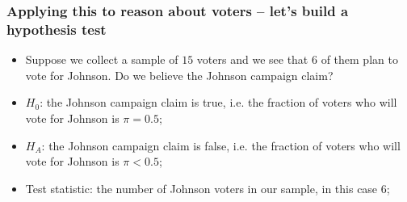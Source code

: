\documentclass[aspectratio=169]{beamer}
\theoremstyle{principle}
\begin{document}
\begin{frame}
\frametitle{Applying this to reason about voters -- let's build a hypothesis test}

\begin{itemize}

\item Suppose we collect a sample of $15$ voters and we see that $6$ of them plan to vote for Johnson.  Do we believe the Johnson campaign claim?
\bigskip
\bigskip

\item $H_0$: the Johnson campaign claim is true, i.e. the fraction of voters who will vote for Johnson is $\pi = 0.5$;
\bigskip
\bigskip

\item $H_A$: the Johnson campaign claim is false, i.e. the fraction of voters who will vote for Johnson is $\pi<0.5$;
\bigskip
\bigskip

\item Test statistic: the number of Johnson voters in our sample, in this case $6$;

\end{itemize}
\end{frame}
\end{document}
